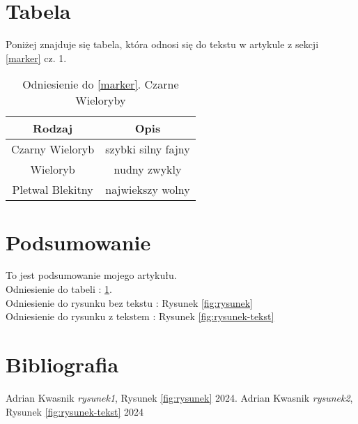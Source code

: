 \documentclass{article}
\begin{document}
\newpage
\section{Tabela}

Poniżej znajduje się tabela, która odnosi się do tekstu w artykule z sekcji \ref{marker} cz. 1.

\begin{table}[h]
  \centering
  \begin{tabular}{|c|c|}
    \hline
    \textbf{Rodzaj} & \textbf{Opis} \\
    \hline
    Czarny Wieloryb & szybki silny fajny \\
    Wieloryb & nudny zwykly \\
    Pletwal Blekitny & najwiekszy wolny \\
    \hline
  \end{tabular}
  \caption{Odniesienie do \ref{marker}. Czarne Wieloryby}
  \label{tab:odniesienie}
\end{table}

\section{Podsumowanie}

To jest podsumowanie mojego artykułu. \\
Odniesienie do tabeli : \ref{tab:odniesienie}.\\
Odniesienie do rysunku bez tekstu : Rysunek \ref{fig:rysunek}\\
Odniesienie do rysunku z tekstem : Rysunek \ref{fig:rysunek-tekst}

\section{Bibliografia}
\begin{thebibliography}{99}
Adrian Kwasnik
\emph{rysunek1},
Rysunek \ref{fig:rysunek}
2024.
Adrian Kwasnik
\emph{rysunek2},
Rysunek \ref{fig:rysunek-tekst}
2024
\end{thebibliography}
\end{document}
